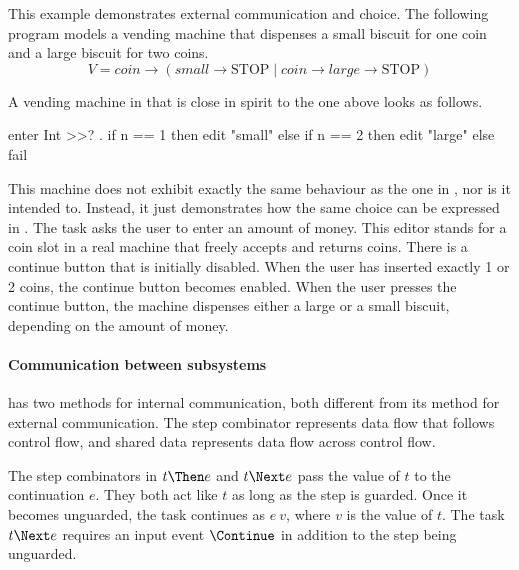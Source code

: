 \begin{example}

This example demonstrates external communication and choice.
The following \CSP program models a vending machine that dispenses a small biscuit for one coin and a large biscuit for two coins.
\begin{equation*}
  V = \textit{coin} \to (\textit{small} \to \text{STOP} \mid \textit{coin} \to \textit{large} \to \text{STOP})
\end{equation*}

A vending machine in \TOPHAT that is close in spirit to the one above looks as follows.
\begin{TASK}
  enter Int >>? \n. if n == 1 then edit "small" else if n == 2 then edit "large" else fail
\end{TASK}
This machine does not exhibit exactly the same behaviour as the one in \CSP, nor is it intended to.
Instead, it just demonstrates how the same choice
can be expressed in \TOP.
The task asks the user to enter an amount of money.
This editor stands for a coin slot in a real machine that freely accepts and returns coins.
There is a continue button that is initially disabled.
When the user has inserted exactly 1 or 2 coins, the continue button becomes enabled.
When the user presses the continue button, the machine dispenses either a large or a small biscuit, depending on the amount of money.

\end{example}



\paragraph{Communication between subsystems}

\TOP has two methods for internal communication, both different from its meth\-od for external communication.
The step combinator represents data flow that follows control flow, and shared data represents data flow across control flow.

The step combinators in $t \Then e$ and $t \Next e$ pass the value of $t$ to the continuation $e$.
They both act like $t$ as long as the step is guarded.
Once it becomes unguarded, the task continues as $e\ v$, where $v$ is the value of $t$.
The task $t \Next e$ requires an input event $\Continue$ in addition to the step being unguarded. %

